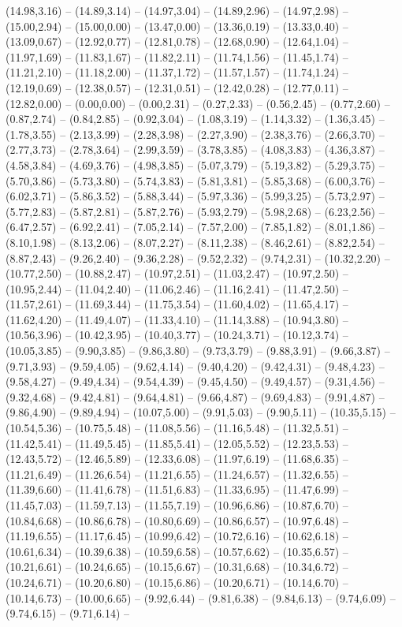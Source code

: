 {  (14.98,3.16) -- (14.89,3.14) -- (14.97,3.04) -- (14.89,2.96) -- (14.97,2.98) -- (15.00,2.94) -- (15.00,0.00) -- (13.47,0.00) -- (13.36,0.19) -- (13.33,0.40) -- (13.09,0.67) -- (12.92,0.77) -- (12.81,0.78) -- (12.68,0.90) -- (12.64,1.04) -- (11.97,1.69) -- (11.83,1.67) -- (11.82,2.11) -- (11.74,1.56) -- (11.45,1.74) -- (11.21,2.10) -- (11.18,2.00) -- (11.37,1.72) -- (11.57,1.57) -- (11.74,1.24) -- (12.19,0.69) -- (12.38,0.57) -- (12.31,0.51) -- (12.42,0.28) -- (12.77,0.11) -- (12.82,0.00) -- (0.00,0.00) -- (0.00,2.31) -- (0.27,2.33) -- (0.56,2.45) -- (0.77,2.60) -- (0.87,2.74) -- (0.84,2.85) -- (0.92,3.04) -- (1.08,3.19) -- (1.14,3.32) -- (1.36,3.45) -- (1.78,3.55) -- (2.13,3.99) -- (2.28,3.98) -- (2.27,3.90) -- (2.38,3.76) -- (2.66,3.70) -- (2.77,3.73) -- (2.78,3.64) -- (2.99,3.59) -- (3.78,3.85) -- (4.08,3.83) -- (4.36,3.87) -- (4.58,3.84) -- (4.69,3.76) -- (4.98,3.85) -- (5.07,3.79) -- (5.19,3.82) -- (5.29,3.75) -- (5.70,3.86) -- (5.73,3.80) -- (5.74,3.83) -- (5.81,3.81) -- (5.85,3.68) -- (6.00,3.76) -- (6.02,3.71) -- (5.86,3.52) -- (5.88,3.44) -- (5.97,3.36) -- (5.99,3.25) -- (5.73,2.97) -- (5.77,2.83) -- (5.87,2.81) -- (5.87,2.76) -- (5.93,2.79) -- (5.98,2.68) -- (6.23,2.56) -- (6.47,2.57) -- (6.92,2.41) -- (7.05,2.14) -- (7.57,2.00) -- (7.85,1.82) -- (8.01,1.86) -- (8.10,1.98) -- (8.13,2.06) -- (8.07,2.27) -- (8.11,2.38) -- (8.46,2.61) -- (8.82,2.54) -- (8.87,2.43) -- (9.26,2.40) -- (9.36,2.28) -- (9.52,2.32) -- (9.74,2.31) -- (10.32,2.20) -- (10.77,2.50) -- (10.88,2.47) -- (10.97,2.51) -- (11.03,2.47) -- (10.97,2.50) -- (10.95,2.44) -- (11.04,2.40) -- (11.06,2.46) -- (11.16,2.41) -- (11.47,2.50) -- (11.57,2.61) -- (11.69,3.44) -- (11.75,3.54) -- (11.60,4.02) -- (11.65,4.17) -- (11.62,4.20) -- (11.49,4.07) -- (11.33,4.10) -- (11.14,3.88) -- (10.94,3.80) -- (10.56,3.96) -- (10.42,3.95) -- (10.40,3.77) -- (10.24,3.71) -- (10.12,3.74) -- (10.05,3.85) -- (9.90,3.85) -- (9.86,3.80) -- (9.73,3.79) -- (9.88,3.91) -- (9.66,3.87) -- (9.71,3.93) -- (9.59,4.05) -- (9.62,4.14) -- (9.40,4.20) -- (9.42,4.31) -- (9.48,4.23) -- (9.58,4.27) -- (9.49,4.34) -- (9.54,4.39) -- (9.45,4.50) -- (9.49,4.57) -- (9.31,4.56) -- (9.32,4.68) -- (9.42,4.81) -- (9.64,4.81) -- (9.66,4.87) -- (9.69,4.83) -- (9.91,4.87) -- (9.86,4.90) -- (9.89,4.94) -- (10.07,5.00) -- (9.91,5.03) -- (9.90,5.11) -- (10.35,5.15) -- (10.54,5.36) -- (10.75,5.48) -- (11.08,5.56) -- (11.16,5.48) -- (11.32,5.51) -- (11.42,5.41) -- (11.49,5.45) -- (11.85,5.41) -- (12.05,5.52) -- (12.23,5.53) -- (12.43,5.72) -- (12.46,5.89) -- (12.33,6.08) -- (11.97,6.19) -- (11.68,6.35) -- (11.21,6.49) -- (11.26,6.54) -- (11.21,6.55) -- (11.24,6.57) -- (11.32,6.55) -- (11.39,6.60) -- (11.41,6.78) -- (11.51,6.83) -- (11.33,6.95) -- (11.47,6.99) -- (11.45,7.03) -- (11.59,7.13) -- (11.55,7.19) -- (10.96,6.86) -- (10.87,6.70) -- (10.84,6.68) -- (10.86,6.78) -- (10.80,6.69) -- (10.86,6.57) -- (10.97,6.48) -- (11.19,6.55) -- (11.17,6.45) -- (10.99,6.42) -- (10.72,6.16) -- (10.62,6.18) -- (10.61,6.34) -- (10.39,6.38) -- (10.59,6.58) -- (10.57,6.62) -- (10.35,6.57) -- (10.21,6.61) -- (10.24,6.65) -- (10.15,6.67) -- (10.31,6.68) -- (10.34,6.72) -- (10.24,6.71) -- (10.20,6.80) -- (10.15,6.86) -- (10.20,6.71) -- (10.14,6.70) -- (10.14,6.73) -- (10.00,6.65) -- (9.92,6.44) -- (9.81,6.38) -- (9.84,6.13) -- (9.74,6.09) -- (9.74,6.15) -- (9.71,6.14) -- }
